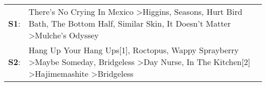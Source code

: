 \begin{supertabular}{p{0.03\textwidth}p{0.92\textwidth}}
 \textbf{S1}:  &                                                            There's No Crying In Mexico\textsuperscript{} \textgreater \enspace Higgins\textsuperscript{}, \enspace Seasons\textsuperscript{}, \enspace Hurt Bird Bath\textsuperscript{}, \enspace The Bottom Half\textsuperscript{}, \enspace Similar Skin\textsuperscript{}, \enspace It Doesn't Matter\textsuperscript{} \textgreater \enspace Mulche's Odyssey\textsuperscript{}  \enspace  \\
 \textbf{S2}:  &  Hang Up Your Hang Ups[1]\textsuperscript{}, \enspace Roctopus\textsuperscript{}, \enspace Wappy Sprayberry\textsuperscript{} \textgreater \enspace Maybe Someday\textsuperscript{}, \enspace Bridgeless\textsuperscript{} \textgreater \enspace Day Nurse\textsuperscript{}, \enspace In The Kitchen[2]\textsuperscript{} \textgreater \enspace Hajimemashite\textsuperscript{} \textgreater \enspace Bridgeless\textsuperscript{}  \enspace  \\
\end{supertabular}
